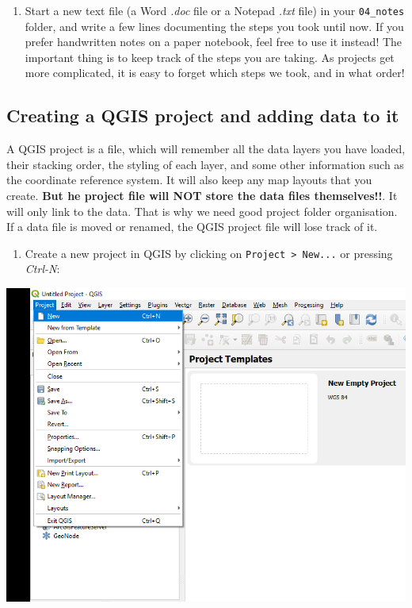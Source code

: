 \documentclass[
  letterpaper,
  DIV=11,
  numbers=noendperiod]{scrreprt}
\providecommand{\tightlist}{%
  \setlength{\itemsep}{0pt}\setlength{\parskip}{0pt}}\usepackage{longtable,booktabs,array}
\begin{document}
\begin{enumerate}
\def\labelenumi{(\arabic{enumi})}
\setcounter{enumi}{7}
\tightlist
\item
  Start a new text file (a Word \emph{.doc} file or a Notepad
  \emph{.txt} file) in your \texttt{04\_notes} folder, and write a few
  lines documenting the steps you took until now. If you prefer
  handwritten notes on a paper notebook, feel free to use it instead!
  The important thing is to keep track of the steps you are taking. As
  projects get more complicated, it is easy to forget which steps we
  took, and in what order!
\end{enumerate}

\subsection{Creating a QGIS project and adding data to
it}\label{creating-a-qgis-project-and-adding-data-to-it}

A QGIS project is a file, which will remember all the data layers you
have loaded, their stacking order, the styling of each layer, and some
other information such as the coordinate reference system. It will also
keep any map layouts that you create. \textbf{But he project file will
NOT store the data files themselves!!}. It will only link to the data.
That is why we need good project folder organisation. If a data file is
moved or renamed, the QGIS project file will lose track of it.

\begin{enumerate}
\def\labelenumi{\arabic{enumi}.}
\setcounter{enumi}{5}
\tightlist
\item
  Create a new project in QGIS by clicking on
  \texttt{Project\ \textgreater{}\ New...} or pressing \emph{Ctrl-N}:
\end{enumerate}

\includegraphics{images/lab_1/lab1_fig1_newproject.png}
\end{document}
